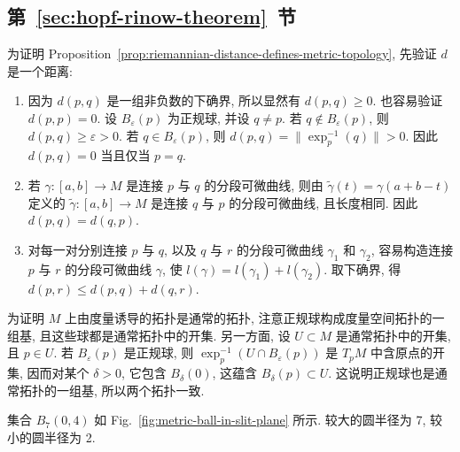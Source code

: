 \subsection{\texorpdfstring{第~\ref{sec:hopf-rinow-theorem}~节}{Hopf-Rinow 定理}}\label{subsec:solutions-hopf-rinow-theorem}

\begin{description}[font=\normalfont,leftmargin=2em,labelwidth=1.5em]
为证明 Proposition~\ref{prop:riemannian-distance-defines-metric-topology}, 先验证 $d$ 是一个距离:
\begin{enumerate}[label=(\roman*),ref=\roman*,leftmargin=*]
\item 因为 $d(p,q)$ 是一组非负数的下确界, 所以显然有 $d(p,q)\ge0$. 也容易验证 $d(p,p)=0$. 设 $B_\varepsilon(p)$ 为正规球, 并设 $q\ne p$. 若 $q\notin B_\varepsilon(p)$, 则 $d(p,q)\ge\varepsilon>0$. 若 $q\in B_\varepsilon(p)$, 则 $d(p,q)=\lVert\exp_p^{-1}(q)\rVert>0$. 因此 $d(p,q)=0$ 当且仅当 $p=q$.
\item 若 $\gamma:[a,b]\to M$ 是连接 $p$ 与 $q$ 的分段可微曲线, 则由 $\widetilde\gamma(t)=\gamma(a+b-t)$ 定义的 $\widetilde\gamma:[a,b]\to M$ 是连接 $q$ 与 $p$ 的分段可微曲线, 且长度相同. 因此 $d(p,q)=d(q,p)$.
\item 对每一对分别连接 $p$ 与 $q$, 以及 $q$ 与 $r$ 的分段可微曲线 $\gamma_1$ 和 $\gamma_2$, 容易构造连接 $p$ 与 $r$ 的分段可微曲线 $\gamma$, 使 $l(\gamma)=l(\gamma_1)+l(\gamma_2)$. 取下确界, 得 $d(p,r)\le d(p,q)+d(q,r)$.
\end{enumerate}
为证明 $M$ 上由度量诱导的拓扑是通常的拓扑, 注意正规球构成度量空间拓扑的一组基, 且这些球都是通常拓扑中的开集. 另一方面, 设 $U\subset M$ 是通常拓扑中的开集, 且 $p\in U$. 若 $B_\varepsilon(p)$ 是正规球, 则 $\exp_p^{-1}(U\cap B_\varepsilon(p))$ 是 $T_pM$ 中含原点的开集, 因而对某个 $\delta>0$, 它包含 $B_\delta(0)$, 这蕴含 $B_\delta(p)\subset U$. 这说明正规球也是通常拓扑的一组基, 所以两个拓扑一致.

集合 $B_7(0,4)$ 如 Fig.~\ref{fig:metric-ball-in-slit-plane} 所示. 较大的圆半径为 7, 较小的圆半径为 2.


\end{description}

